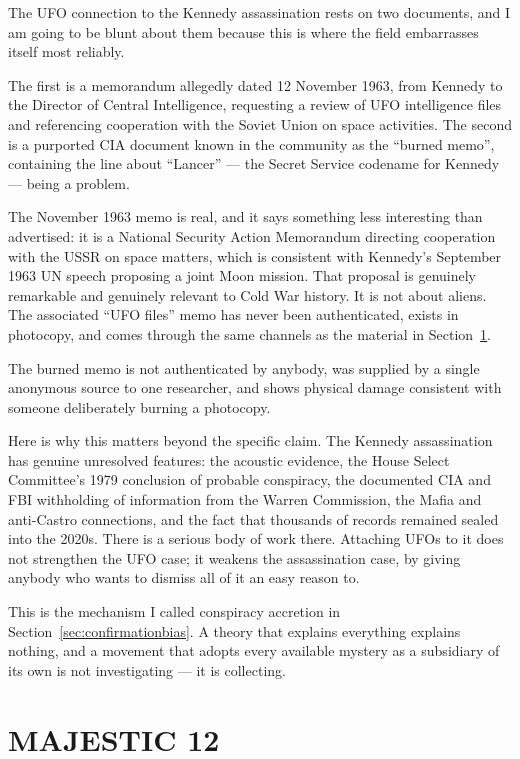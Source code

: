 The UFO connection to the Kennedy assassination rests on two documents, and I am going to be
blunt about them because this is where the field embarrasses itself most reliably.

The first is a memorandum allegedly dated 12 November 1963, from Kennedy to the Director of
Central Intelligence, requesting a review of UFO intelligence files and referencing
cooperation with the Soviet Union on space activities. The second is a purported CIA document
known in the community as the ``burned memo'', containing the line about ``Lancer'' --- the
Secret Service codename for Kennedy --- being a problem.

The November 1963 memo is real, and it says something less interesting than advertised: it is
a National Security Action Memorandum directing cooperation with the USSR on space matters,
which is consistent with Kennedy's September 1963 UN speech proposing a joint Moon mission.
That proposal is genuinely remarkable and genuinely relevant to Cold War history. It is not
about aliens. The associated ``UFO files'' memo has never been authenticated, exists in
photocopy, and comes through the same channels as the material in Section~\ref{sec:mj12}.

The burned memo is not authenticated by anybody, was supplied by a single anonymous source to
one researcher, and shows physical damage consistent with someone deliberately burning a
photocopy.

Here is why this matters beyond the specific claim. The Kennedy assassination has genuine
unresolved features: the acoustic evidence, the House Select Committee's 1979 conclusion of
probable conspiracy, the documented CIA and FBI withholding of information from the Warren
Commission, the Mafia and anti-Castro connections, and the fact that thousands of records
remained sealed into the 2020s. There is a serious body of work there. Attaching UFOs to it
does not strengthen the UFO case; it weakens the assassination case, by giving anybody who
wants to dismiss all of it an easy reason to.

This is the mechanism I called conspiracy accretion in Section~\ref{sec:confirmationbias}. A theory that explains
everything explains nothing, and a movement that adopts every available mystery as a subsidiary
of its own is not investigating --- it is collecting.

\section{MAJESTIC 12}\label{sec:mj12}

